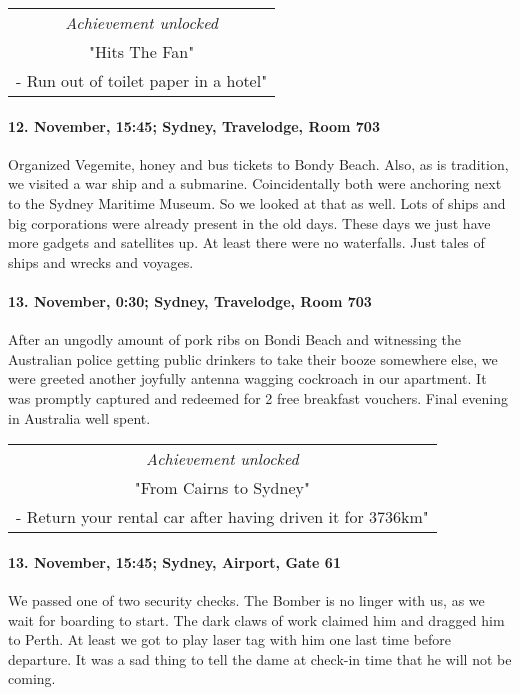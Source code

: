 \begin{center}
\begin{tabular}{||c||}
\emph{Achievement unlocked}\\
"Hits The Fan"\\
\multicolumn{1}{||p{0.8\textwidth}||}{\footnotesize - Run out of toilet paper in a hotel"} \\
\end{tabular}
\end{center}

\paragraph{12. November, 15:45; Sydney, Travelodge, Room 703}
Organized Vegemite, honey and bus tickets to Bondy Beach.
Also, as is tradition, we visited a war ship and a submarine.
Coincidentally both were anchoring next to the Sydney Maritime Museum.
So we looked at that as well.
Lots of ships and big corporations were already present in the old days.
These days we just have more gadgets and satellites up.
At least there were no waterfalls.
Just tales of ships and wrecks and voyages.

\paragraph{13. November, 0:30; Sydney, Travelodge, Room 703}
After an ungodly amount of pork ribs on Bondi Beach and witnessing the Australian police getting public drinkers to take their booze somewhere else, we were greeted another joyfully antenna wagging cockroach in our apartment.
It was promptly captured and redeemed for 2 free breakfast vouchers.
Final evening in Australia well spent.

\begin{center}
\begin{tabular}{||c||}
\emph{Achievement unlocked}\\
"From Cairns to Sydney"\\
\multicolumn{1}{||p{0.8\textwidth}||}{\footnotesize - Return your rental car after having driven it for 3736km"} \\
\end{tabular}
\end{center}

\paragraph{13. November, 15:45; Sydney, Airport, Gate 61}
We passed one of two security checks.
The Bomber is no linger with us, as we wait for boarding to start.
The dark claws of work claimed him and dragged him to Perth.
At least we got to play laser tag with him one last time before departure.
It was a sad thing to tell the dame at check-in time that he will not be coming.

